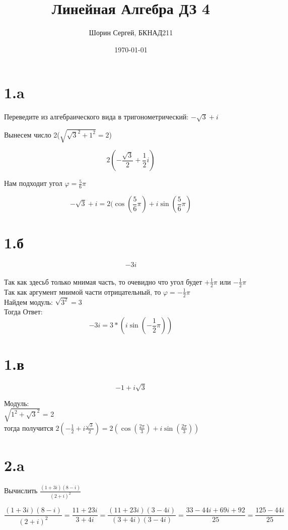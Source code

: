 \documentclass[a4paper]{article}
\author{Шорин Сергей, БКНАД211}
\title{Линейная Алгебра ДЗ 4}
\date{\today}
\begin{document}
\maketitle

\newpage

\section*{1.a}
Переведите из алгебраического вида в тригонометрический: $ -\sqrt{3} + i$

Вынесем число 2($ \sqrt{\sqrt{3}^2 + 1^2} = 2$)

$$2 ( -\frac{\sqrt{3}}{2} + \frac{1}{2}i)$$

Нам подходит угол $\varphi = \frac{5}{6} \pi$

$$ -\sqrt{3} + i = 2(\cos(\frac{5}{6} \pi) + i\sin(\frac{5}{6} \pi)$$



\section*{1.б}
$$-3i$$ \\
Так как здесьб только мнимая часть, то очевидно что угол будет $  + \frac{1}{2}\pi$ или  $  - \frac{1}{2}\pi$\\
Так как аргумент мнимой части отрицательный, то  $\varphi =  - \frac{1}{2}\pi$\\
Найдем модуль: $\sqrt{3^2} = 3$\\
Тогда Ответ:\\
$$-3i = 3*(i\sin(-\frac{1}{2}\pi))$$


\section*{1.в}
$$-1 + i\sqrt{3}$$

Модуль:\\
$\sqrt{1^2 +\sqrt{3}^2}$ = 2\\
тогда получится $ 2(-\frac{1}{2} + i \frac{\sqrt{3}}{2}) = 2(\cos(\frac{2\pi}{3}) + i\sin(\frac{2\pi}{3}))$




\section*{2.a}
Вычислить $\frac{(1 + 3i)(8 - i)}{(2 + i)^ 2}$

$$\frac{(1 + 3i)(8 - i)}{(2 + i)^ 2}= \frac{11 + 23i}{3 + 4i} = \frac{(11 + 23i)(3 - 4i)}{(3 + 4i)(3 - 4i)}= \frac{33 -44i + 69i + 92}{25} = \frac{125 -44i}{25}$$
\end{document}
